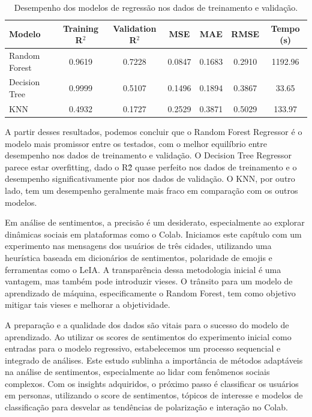 \begin{table}[h]
	\centering
	\begin{tabular}{|l|c|c|c|c|c|c|}
		\hline
		\textbf{Modelo} & \textbf{Training R$^2$} & \textbf{Validation R$^2$} & \textbf{MSE} & \textbf{MAE} & \textbf{RMSE} & \textbf{Tempo (s)} \\
		\hline
		Random Forest   & 0.9619                  & 0.7228                    & 0.0847       & 0.1683       & 0.2910        & 1192.96            \\
		\hline
		Decision Tree   & 0.9999                  & 0.5107                    & 0.1496       & 0.1894       & 0.3867        & 33.65              \\
		\hline
		KNN             & 0.4932                  & 0.1727                    & 0.2529       & 0.3871       & 0.5029        & 133.97             \\
		\hline
	\end{tabular}
	\caption{Desempenho dos modelos de regressão nos dados de treinamento e validação.}
	\label{tab:model_performance}
\end{table}	

A partir desses resultados, podemos concluir que o Random Forest Regressor é o modelo mais promissor entre os testados, com o melhor equilíbrio entre desempenho nos dados de treinamento e validação. O Decision Tree Regressor parece estar overfitting, dado o R\^2 quase perfeito nos dados de treinamento e o desempenho significativamente pior nos dados de validação. O KNN, por outro lado, tem um desempenho geralmente mais fraco em comparação com os outros modelos.

Em análise de sentimentos, a precisão é um desiderato, especialmente ao explorar dinâmicas sociais em plataformas como o Colab. Iniciamos este capítulo com um experimento nas mensagens dos usuários de três cidades, utilizando uma heurística baseada em dicionários de sentimentos, polaridade de emojis e ferramentas como o LeIA. A transparência dessa metodologia inicial é uma vantagem, mas também pode introduzir vieses. O trânsito para um modelo de aprendizado de máquina, especificamente o Random Forest, tem como objetivo mitigar tais vieses e melhorar a objetividade.

A preparação e a qualidade dos dados são vitais para o sucesso do modelo de aprendizado. Ao utilizar os scores de sentimentos do experimento inicial como entradas para o modelo regressivo, estabelecemos um processo sequencial e integrado de análises. Este estudo sublinha a importância de métodos adaptáveis na análise de sentimentos, especialmente ao lidar com fenômenos sociais complexos. Com os insights adquiridos, o próximo passo é classificar os usuários em personas, utilizando o score de sentimentos, tópicos de interesse e modelos de classificação para desvelar as tendências de polarização e interação no Colab.

